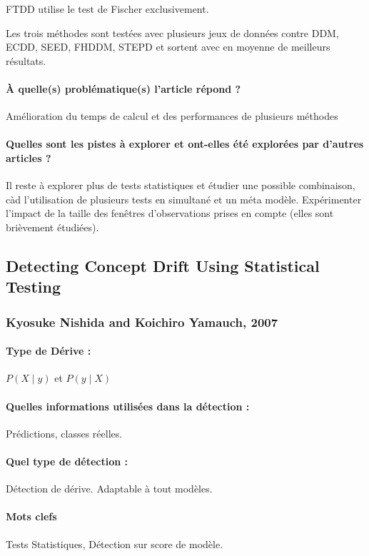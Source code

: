 \documentclass[11pt,a4paper]{report}
\begin{document}
FTDD utilise le test de Fischer exclusivement.

Les trois méthodes sont testées avec plusieurs jeux de données contre DDM, ECDD, SEED, FHDDM, STEPD et sortent avec en moyenne de meilleurs résultats.
\paragraph{À quelle(s) problématique(s) l'article répond ?} Amélioration du temps de calcul et des performances de plusieurs méthodes

\paragraph{Quelles sont les pistes à explorer et ont-elles été explorées par d'autres articles ?} Il reste à explorer plus de tests statistiques et étudier une possible combinaison, càd l'utilisation de plusieurs tests en simultané et un méta modèle. Expérimenter l'impact de la taille des fenêtres d'observations prises en compte (elles sont brièvement étudiées).



\subsection{Detecting Concept Drift Using Statistical Testing}
\subsubsection{Kyosuke Nishida and Koichiro Yamauch, 2007}

\paragraph{Type de Dérive :} $P(X\mid y)$ et $P(y \mid X)$
\paragraph{Quelles informations utilisées dans la détection :} Prédictions, classes réelles.
\paragraph{Quel type de détection :} Détection de dérive. Adaptable à tout modèles.

\paragraph{Mots clefs} Tests Statistiques, Détection sur score de modèle.
\end{document}
